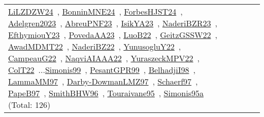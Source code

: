 {\begin{longtable}{p{3cm}r>{\raggedright\arraybackslash}p{6cm}>{\raggedright\arraybackslash}p{6cm}>{\raggedright\arraybackslash}p{8cm}}
\href{../works/LiLZDZW24.pdf}{LiLZDZW24}~\cite{LiLZDZW24}, \href{../works/BonninMNE24.pdf}{BonninMNE24}~\cite{BonninMNE24}, \href{../works/ForbesHJST24.pdf}{ForbesHJST24}~\cite{ForbesHJST24}, \href{../works/Adelgren2023.pdf}{Adelgren2023}~\cite{Adelgren2023}, \href{../works/AbreuPNF23.pdf}{AbreuPNF23}~\cite{AbreuPNF23}, \href{../works/IsikYA23.pdf}{IsikYA23}~\cite{IsikYA23}, \href{../works/NaderiBZR23.pdf}{NaderiBZR23}~\cite{NaderiBZR23}, \href{../works/EfthymiouY23.pdf}{EfthymiouY23}~\cite{EfthymiouY23}, \href{../works/PovedaAA23.pdf}{PovedaAA23}~\cite{PovedaAA23}, \href{../works/LuoB22.pdf}{LuoB22}~\cite{LuoB22}, \href{../works/GeitzGSSW22.pdf}{GeitzGSSW22}~\cite{GeitzGSSW22}, \href{../works/AwadMDMT22.pdf}{AwadMDMT22}~\cite{AwadMDMT22}, \href{../works/NaderiBZ22.pdf}{NaderiBZ22}~\cite{NaderiBZ22}, \href{../works/YunusogluY22.pdf}{YunusogluY22}~\cite{YunusogluY22}, \href{../works/CampeauG22.pdf}{CampeauG22}~\cite{CampeauG22}, \href{../works/NaqviAIAAA22.pdf}{NaqviAIAAA22}~\cite{NaqviAIAAA22}, \href{../works/YuraszeckMPV22.pdf}{YuraszeckMPV22}~\cite{YuraszeckMPV22}, \href{../works/ColT22.pdf}{ColT22}~\cite{ColT22}...\href{../works/Simonis99.pdf}{Simonis99}~\cite{Simonis99}, \href{../works/PesantGPR99.pdf}{PesantGPR99}~\cite{PesantGPR99}, \href{../works/BelhadjiI98.pdf}{BelhadjiI98}~\cite{BelhadjiI98}, \href{../works/LammaMM97.pdf}{LammaMM97}~\cite{LammaMM97}, \href{../works/Darby-DowmanLMZ97.pdf}{Darby-DowmanLMZ97}~\cite{Darby-DowmanLMZ97}, \href{../works/Schaerf97.pdf}{Schaerf97}~\cite{Schaerf97}, \href{../works/PapeB97.pdf}{PapeB97}~\cite{PapeB97}, \href{../works/SmithBHW96.pdf}{SmithBHW96}~\cite{SmithBHW96}, \href{../works/Touraivane95.pdf}{Touraivane95}~\cite{Touraivane95}, \href{../works/Simonis95a.pdf}{Simonis95a}~\cite{Simonis95a} (Total: 126)\\

\end{longtable}}
